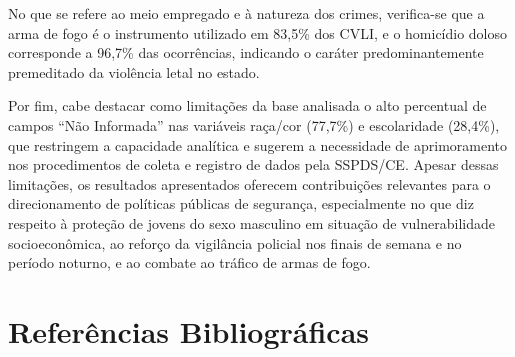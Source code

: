 \documentclass[12pt,a4paper]{article}
\begin{document}
No que se refere ao meio empregado e à natureza dos crimes, verifica-se que a arma de fogo é o instrumento utilizado em 83,5\% dos CVLI, e o homicídio doloso corresponde a 96,7\% das ocorrências, indicando o caráter predominantemente premeditado da violência letal no estado.

Por fim, cabe destacar como limitações da base analisada o alto percentual de campos ``Não Informada'' nas variáveis raça/cor (77,7\%) e escolaridade (28,4\%), que restringem a capacidade analítica e sugerem a necessidade de aprimoramento nos procedimentos de coleta e registro de dados pela SSPDS/CE. Apesar dessas limitações, os resultados apresentados oferecem contribuições relevantes para o direcionamento de políticas públicas de segurança, especialmente no que diz respeito à proteção de jovens do sexo masculino em situação de vulnerabilidade socioeconômica, ao reforço da vigilância policial nos finais de semana e no período noturno, e ao combate ao tráfico de armas de fogo.

\newpage

\section*{Referências Bibliográficas}
\end{document}
